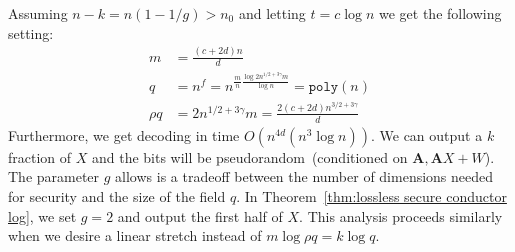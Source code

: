 \documentclass[11pt]{article}
\newcommand{\thref}[1]{\mbox{Theorem~\ref{#1}}}
\newcommand{\vect}[1]{\ensuremath{\textbf{#1}}}
\newcommand{\poly}{\ensuremath{\mathtt{poly}}\xspace}
\newcommand{\vA}{\vect{A}}
\begin{document}
Assuming $n-k = n(1-1/g) > n_0$ and letting $t= c\log n$ we get the following setting:
\begin{align*}
m &= \frac{(c+2d)n}{d}\\
q & = n^f = n^{\frac{m}{n}\frac{\log 2n^{1/2+3\gamma}m}{\log n}} = \poly(n)\\
\rho q &= 2n^{1/2+3\gamma}m = \frac{2(c+2d)n^{3/2+3\gamma}}{d}
\end{align*}
Furthermore, we get decoding in time $O(n^{4d}(n^3\log n))$.  We can output a $k$ fraction of $X$ and the bits will be pseudorandom~(conditioned on $\vA, \vA X+W$).  The parameter $g$ allows is a tradeoff between the number of dimensions needed for security and the size of the field $q$.  In \thref{thm:lossless secure conductor log}, we set $g=2$ and output the first half of $X$.  This analysis proceeds similarly when we desire a linear stretch instead of $m\log \rho q = k\log q$.  %
\end{document}
